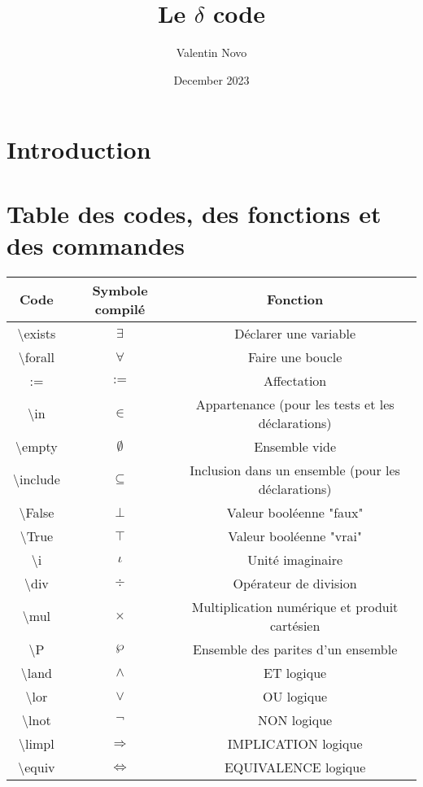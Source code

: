 \documentclass{article}
\title{Le $\delta$ code}
\author{Valentin Novo}
\date{December 2023}
\newcommand{\bs}{\textbackslash}
\begin{document}
\maketitle

\section{Introduction}

\section{Table des codes, des fonctions et des commandes}
\begin{longtable}{|c|c|c|}
    \hline
    Code & Symbole compilé & Fonction  \\
    \hline
     \bs exists & $\exists$ & Déclarer une variable \\
     \hline
     \bs forall & $\forall$ & Faire une boucle \\
     \hline
     := & $:=$ & Affectation \\
     \hline
     \bs in & $\in$ & Appartenance (pour les tests et les déclarations) \\
     \hline
     \bs empty & $\emptyset$ & Ensemble vide \\
     \hline
     \bs include & $\subseteq$ & Inclusion dans un ensemble (pour les déclarations) \\
     \hline
     \bs False & $\bot$ & Valeur booléenne "faux" \\
     \hline
     \bs True & $\top$ & Valeur booléenne "vrai" \\
     \hline
     \bs i & $\iota$ & Unité imaginaire \\
     \hline
     \bs div & $\div$ & Opérateur de division \\
     \hline
     \bs mul & $\times$ & Multiplication numérique et produit cartésien \\
     \hline
     \bs P & $\wp$ & Ensemble des parites d'un ensemble \\
     \hline
     \bs land & $\land$ & ET logique \\
     \hline
     \bs lor & $\lor$ & OU logique \\
     \hline
     \bs lnot & $\lnot$ & NON logique \\
     \hline
     \bs limpl & $\Rightarrow$ & IMPLICATION logique \\
     \hline
     \bs equiv & $\Leftrightarrow$ & EQUIVALENCE logique \\

\end{longtable}
\end{document}
